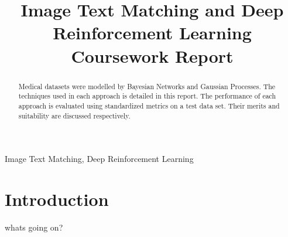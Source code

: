 \documentclass[conference]{IEEEtran}
\begin{document}
\title{Image Text Matching and Deep Reinforcement Learning Coursework Report}

\author{
}

\maketitle

\begin{abstract}
    Medical datasets were modelled by Bayesian Networks and Gaussian Processes.
    The techniques used in each approach is detailed in this report.
    The performance of each approach is evaluated using standardized metrics on a test data set.
    Their merits and suitability are discussed respectively.
\end{abstract}

\begin{IEEEkeywords}
    Image Text Matching, Deep Reinforcement Learning
\end{IEEEkeywords}

\section{Introduction}


whats going on? \cite{noauthor_probabilistic_nodate}


\end{document}
